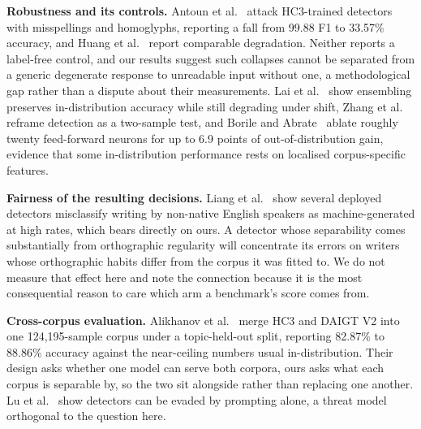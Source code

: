 \textbf{Robustness and its controls.} Antoun et al.~\cite{Antoun2023towards} attack HC3-trained detectors with misspellings and homoglyphs, reporting a fall from 99.88 F1 to 33.57\% accuracy, and Huang et al.~\cite{Huang2024generated} report comparable degradation. Neither reports a label-free control, and our results suggest such collapses cannot be separated from a generic degenerate response to unreadable input without one, a methodological gap rather than a dispute about their measurements. Lai et al.~\cite{Lai2024adaptive} show ensembling preserves in-distribution accuracy while still degrading under shift, Zhang et al.~\cite{Zhang2024detecting} reframe detection as a two-sample test, and Borile and Abrate~\cite{Borile2025generalize} ablate roughly twenty feed-forward neurons for up to 6.9 points of out-of-distribution gain, evidence that some in-distribution performance rests on localised corpus-specific features.

\textbf{Fairness of the resulting decisions.} Liang et al.~\cite{Liang2023gpt} show several deployed detectors misclassify writing by non-native English speakers as machine-generated at high rates, which bears directly on ours. A detector whose separability comes substantially from orthographic regularity will concentrate its errors on writers whose orthographic habits differ from the corpus it was fitted to. We do not measure that effect here and note the connection because it is the most consequential reason to care which arm a benchmark's score comes from.

\textbf{Cross-corpus evaluation.} Alikhanov et al.~\cite{Alikhanov2026generated} merge HC3 and DAIGT V2 into one 124,195-sample corpus under a topic-held-out split, reporting 82.87\% to 88.86\% accuracy against the near-ceiling numbers usual in-distribution. Their design asks whether one model can serve both corpora, ours asks what each corpus is separable by, so the two sit alongside rather than replacing one another. Lu et al.~\cite{Lu2023large} show detectors can be evaded by prompting alone, a threat model orthogonal to the question here.